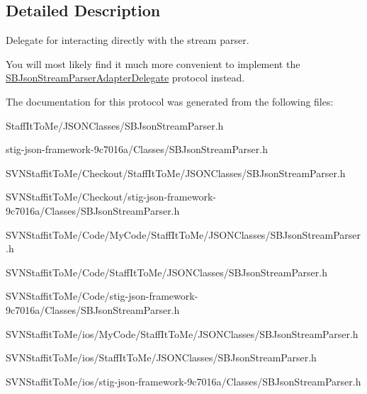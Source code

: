 \subsection{\-Detailed \-Description}
\-Delegate for interacting directly with the stream parser. 

\-You will most likely find it much more convenient to implement the \hyperlink{protocol_s_b_json_stream_parser_adapter_delegate-p}{\-S\-B\-Json\-Stream\-Parser\-Adapter\-Delegate} protocol instead. 

\-The documentation for this protocol was generated from the following files\-:\begin{DoxyCompactItemize}
\item 
\-Staff\-It\-To\-Me/\-J\-S\-O\-N\-Classes/\-S\-B\-Json\-Stream\-Parser.\-h\item 
stig-\/json-\/framework-\/9c7016a/\-Classes/\-S\-B\-Json\-Stream\-Parser.\-h\item 
\-S\-V\-N\-Staffit\-To\-Me/\-Checkout/\-Staff\-It\-To\-Me/\-J\-S\-O\-N\-Classes/\-S\-B\-Json\-Stream\-Parser.\-h\item 
\-S\-V\-N\-Staffit\-To\-Me/\-Checkout/stig-\/json-\/framework-\/9c7016a/\-Classes/\-S\-B\-Json\-Stream\-Parser.\-h\item 
\-S\-V\-N\-Staffit\-To\-Me/\-Code/\-My\-Code/\-Staff\-It\-To\-Me/\-J\-S\-O\-N\-Classes/\-S\-B\-Json\-Stream\-Parser.\-h\item 
\-S\-V\-N\-Staffit\-To\-Me/\-Code/\-Staff\-It\-To\-Me/\-J\-S\-O\-N\-Classes/\-S\-B\-Json\-Stream\-Parser.\-h\item 
\-S\-V\-N\-Staffit\-To\-Me/\-Code/stig-\/json-\/framework-\/9c7016a/\-Classes/\-S\-B\-Json\-Stream\-Parser.\-h\item 
\-S\-V\-N\-Staffit\-To\-Me/ios/\-My\-Code/\-Staff\-It\-To\-Me/\-J\-S\-O\-N\-Classes/\-S\-B\-Json\-Stream\-Parser.\-h\item 
\-S\-V\-N\-Staffit\-To\-Me/ios/\-Staff\-It\-To\-Me/\-J\-S\-O\-N\-Classes/\-S\-B\-Json\-Stream\-Parser.\-h\item 
\-S\-V\-N\-Staffit\-To\-Me/ios/stig-\/json-\/framework-\/9c7016a/\-Classes/\-S\-B\-Json\-Stream\-Parser.\-h\end{DoxyCompactItemize}
